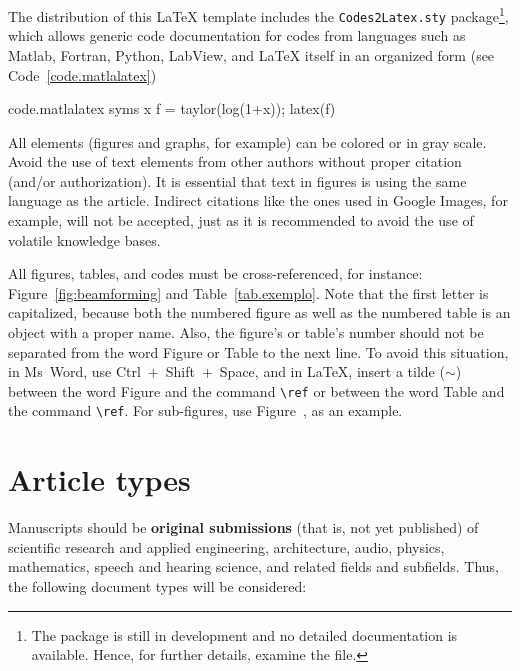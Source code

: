 \documentclass[12pt, a4paper, twoside, twocolumn]{article}
\begin{document}
The distribution of this \LaTeX\xspace template includes the \texttt{Codes2Latex.sty} package\footnote{The package is still in development and no detailed documentation is available. Hence, for further details, examine the  file.}, which allows generic code documentation for codes from languages such as Matlab, Fortran, Python, LabView, and \LaTeX{} itself in an organized form (see Code~\ref{code.matlalatex})

\begin{matlabcode}{code.matlalatex}
  syms x
  f = taylor(log(1+x));
  latex(f)
\end{matlabcode}

All elements (figures and graphs, for example) can be colored or in gray scale. Avoid the use of text elements from other authors without proper citation (and/or authorization). It is essential that text in figures is using the same language as the article. Indirect citations like the ones used in Google Images, for example, will not be accepted, just as it is recommended to avoid the use of volatile knowledge bases.

All figures, tables, and codes must be cross-referenced, for instance: Figure~\ref{fig:beamforming} and Table~\ref{tab.exemplo}. Note that the first letter is capitalized, because both the numbered figure as well as the numbered table is an object with a proper name. Also, the figure's or table's number should not be separated from the word Figure or Table to the next line. To avoid this situation, in Ms~Word, use Ctrl~+~Shift~+~Space, and in \LaTeX, insert a tilde ($\sim$) between the word Figure and the command \verb=\ref= or between the word Table and the command \verb=\ref=.
%
For sub-figures, use Figure~, as an example.

\section{Article types}

Manuscripts should be \textbf{original submissions} (that is, not yet published) of scientific research and applied engineering, architecture, audio, physics, mathematics, speech and hearing science, and related fields and subfields. Thus, the following document types will be considered:
\end{document}
